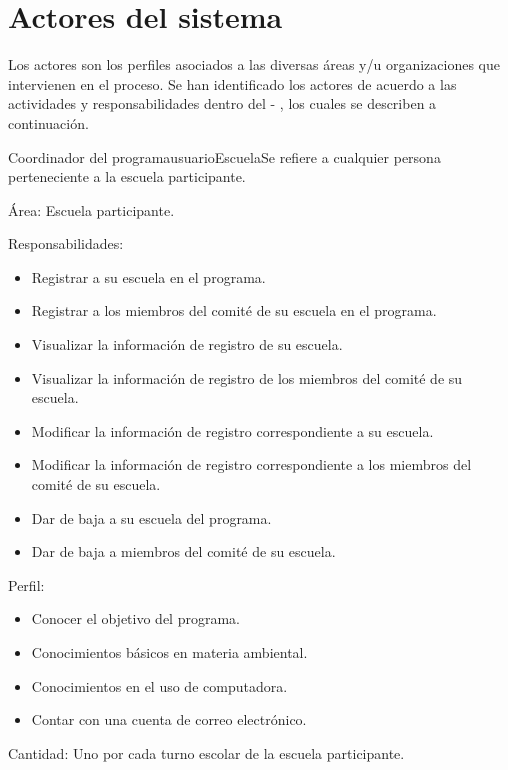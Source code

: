 \section{Actores del sistema}\label{sec:Comportamiento:ActoresSistema}
Los actores son los perfiles asociados a las diversas áreas y/u organizaciones que intervienen en el proceso. Se han identificado los actores de acuerdo a las actividades y responsabilidades dentro del \papear - \gie, los cuales se describen a continuación.


\begin{actor}{Coordinador del programa}{usuarioEscuela}{Se refiere a cualquier persona perteneciente a la escuela participante.}
    \item[Área:] Escuela participante.
    \item[Responsabilidades:] \hspace{1pt}
    \begin{itemize}
	\item Registrar a su escuela en el programa.
	\item Registrar a los miembros del comité de su escuela en el programa.
	\item Visualizar la información de registro de su escuela.
	\item Visualizar la información de registro de los miembros del comité de su escuela.
	\item Modificar la información de registro correspondiente a su escuela.
	\item Modificar la información de registro correspondiente a los miembros del comité de su escuela.
	\item Dar de baja a su escuela del programa.
	\item Dar de baja a miembros del comité de su escuela.
    \end{itemize}
    \item[Perfil:] \hspace{1pt}
    \begin{itemize}
	\item Conocer el objetivo del programa.
	\item Conocimientos básicos en materia ambiental.
	\item Conocimientos en el uso de computadora.
	\item Contar con una cuenta de correo electrónico.
    \end{itemize}
    \item[Cantidad:] Uno por cada turno escolar de la escuela participante.
\end{actor}

